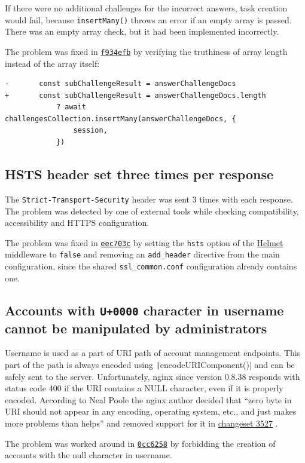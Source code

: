If there were no additional challenges for the incorrect answers, task creation would fail, because \texttt{insertMany()} throws an error if an empty array is passed. There was an empty array check, but it had been implemented incorrectly.

The problem was fixed in \href{https://github.com/krzysdz/inz/commit/f934efb0c50f0156d73bd78fcfcd6a12b5943b1e}{\texttt{f934efb}} by verifying the truthiness of array length instead of the array itself:
\begin{verbatim}
-		const subChallengeResult = answerChallengeDocs
+		const subChallengeResult = answerChallengeDocs.length
			? await challengesCollection.insertMany(answerChallengeDocs, {
				session,
			})
\end{verbatim}

\subsection{HSTS header set three times per response}

The \texttt{Strict-Transport-Security} header was sent 3 times with each response. The problem was detected by one of external tools while checking compatibility, accessibility and HTTPS configuration.

The problem was fixed in \href{https://github.com/krzysdz/inz/commit/eec703c98ecb6720c3c2eb0ceee36ca3d7da8aa2}{\texttt{eec703c}} by setting the \texttt{hsts} option of the \href{https://helmetjs.github.io/}{Helmet} middleware to \texttt{false} and removing an \texttt{add\_header} directive from the main configuration, since the shared \texttt{ssl\_common.conf} configuration already contains one.

\subsection{Accounts with \texttt{U+0000} character in username cannot be manipulated by administrators}

Username is used as a part of URI path of account management endpoints. This part of the path is always encoded using \texttt|encodeURIComponent()| and can be safely sent to the server. Unfortunately, nginx since version 0.8.38 responds with status code 400 if the URI contains a NULL character, even if it is properly encoded. According to Neal Poole the nginx author decided that \enquote{zero byte in URI should not appear in any encoding, operating system, etc., and just makes more problems than helps} and removed support for it in \href{https://hg.nginx.org/nginx/rev/84905c7b2aa7}{changeset 3527} \cite{bib:nginx-null}.

The problem was worked around in \href{https://github.com/krzysdz/inz/commit/0cc6258451fb69f4763be15cf77772b226d2a974}{\texttt{0cc6258}} by forbidding the creation of accounts with the null character in username.
